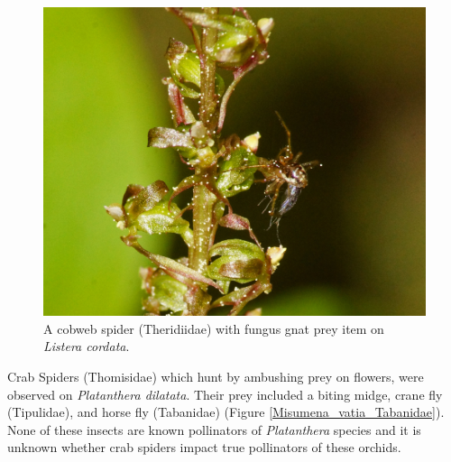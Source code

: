 \begin{multicols}{2}
\begin{figure}[H]
\begin{center}
\vspace{2mm}
\includegraphics[width=\textwidth]{img/Theridiidae_Sciaroidea.jpg}
\caption{A cobweb spider (Theridiidae) with fungus gnat prey item on \emph{Listera cordata}.}
\label{Theridiidae_Sciaroidea}
\end{center}
\end{figure}




Crab Spiders (Thomisidae) which hunt by ambushing prey on flowers, were
observed on \emph{Platanthera dilatata}. Their prey included a biting
midge, crane fly (Tipulidae), and horse fly (Tabanidae) (Figure \ref{Misumena_vatia_Tabanidae}).
None of these insects are known pollinators of \emph{Platanthera}
species and it is unknown whether crab spiders impact true pollinators
of these orchids.


\end{multicols}
